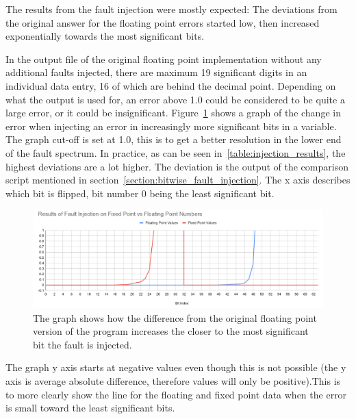 


The results from the fault injection were mostly expected: The deviations from the original answer for the floating point errors started low, then increased exponentially towards the most significant bits.

In the output file of the original floating point implementation without any additional faults injected, there are maximum 19 significant digits in an individual data entry, 16 of which are behind the decimal point. Depending on what the output is used for, an error above 1.0 could be considered to be quite a large error, or it could be insignificant. Figure~\ref{fig:graph_fixed_vs_float_error} shows a graph of the change in error when injecting an error in increasingly more significant bits in a variable. The graph cut-off is set at 1.0, this is to get a better resolution in the lower end of the fault spectrum. In practice, as can be seen in~\ref{table:injection_results}, the highest deviations are a lot higher. The deviation is the output of the comparison script mentioned in section~\ref{section:bitwise_fault_injection}. The x axis describes which bit is flipped, bit number 0 being the least significant bit.

\begin{figure}[h!]
    \centering
    \includegraphics[width=\linewidth]{Images/graph_float_vs_fixed_fault_injection_results.png}
    \caption{The graph shows how the difference from the original floating point version of the program increases the closer to the most significant bit the fault is injected. }
    \label{fig:graph_fixed_vs_float_error}
\end{figure}


The graph y axis starts at negative values even though this is not possible (the y axis is average absolute difference, therefore values will only be positive).This is to more clearly show the line for the floating and fixed point data when the error is small toward the least significant bits.

